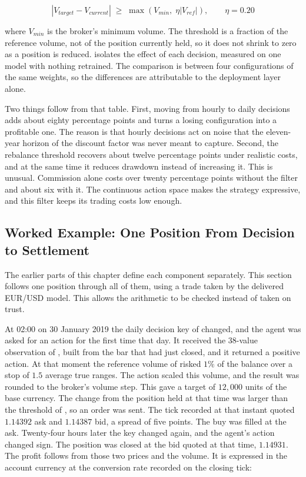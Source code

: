 \begin{equation}
\left| V_{target} - V_{current} \right| \;\geq\; \max\!\left(V_{min},\; \eta \left| V_{ref} \right|\right), \qquad \eta = 0.20
\label{Equation:Hysteresis}
\end{equation}

where $V_{min}$ is the broker's minimum volume. The threshold is a fraction of the reference volume, not of the position currently held, so it does not shrink to zero as a position is reduced.  isolates the effect of each decision, measured on one model with nothing retrained. The comparison is between four configurations of the same weights, so the differences are attributable to the deployment layer alone.



Two things follow from that table. First, moving from hourly to daily decisions adds about eighty percentage points and turns a losing configuration into a profitable one. The reason is that hourly decisions act on noise that the eleven-year horizon of the discount factor was never meant to capture. Second, the rebalance threshold recovers about twelve percentage points under realistic costs, and at the same time it reduces drawdown instead of increasing it. This is unusual. Commission alone costs over twenty percentage points without the filter and about six with it. The continuous action space makes the strategy expressive, and this filter keeps its trading costs low enough.

\subsection{Worked Example: One Position From Decision to Settlement}

The earlier parts of this chapter define each component separately. This section follows one position through all of them, using a trade taken by the delivered EUR/USD model. This allows the arithmetic to be checked instead of taken on trust.

At 02:00 on 30 January 2019 the daily decision key of  changed, and the agent was asked for an action for the first time that day. It received the 38-value observation of , built from the bar that had just closed, and it returned a positive action. At that moment the reference volume of  risked $1\%$ of the balance over a stop of $1.5$ average true ranges. The action scaled this volume, and the result was rounded to the broker's volume step. This gave a target of $12{,}000$ units of the base currency. The change from the position held at that time was larger than the threshold of , so an order was sent. The tick recorded at that instant quoted $1.14392$ ask and $1.14387$ bid, a spread of five points. The buy was filled at the ask. Twenty-four hours later the key changed again, and the agent's action changed sign. The position was closed at the bid quoted at that time, $1.14931$. The profit follows from those two prices and the volume. It is expressed in the account currency at the conversion rate recorded on the closing tick:

